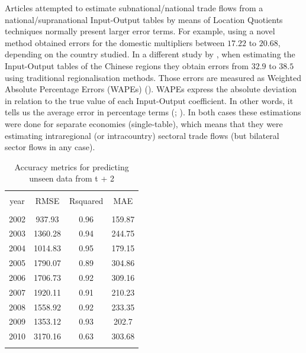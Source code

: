 \documentclass[]{interact}
\theoremstyle{plain}%
\theoremstyle{definition}
\theoremstyle{remark}
\begin{document}
Articles attempted to estimate subnational/national trade flows from a
national/supranational Input-Output tables by means of Location
Quotients techniques normally present larger error terms. For example,
\citet{pereira2020bidimensional} using a novel method obtained errors
for the domestic multipliers between \(17.22\) to \(20.68\), depending
on the country studied. In a different study by
\citet{jiang2012improved}, when estimating the Input-Output tables of
the Chinese regions they obtain errors from \(32.9\) to \(38.5\) using
traditional regionalisation methods. Those errors are measured as
Weighted Absolute Percentage Errors (WAPEs)
(\citet{sawyer1983experiments}). WAPEs express the absolute deviation in
relation to the true value of each Input-Output coefficient. In other
words, it tells us the average error in percentage terms
(\citet{lamonica2018performance}; \citet{pereira2020bidimensional}). In
both cases these estimations were done for separate economies
(single-table), which means that they were estimating intraregional (or
intracountry) sectoral trade flows (but bilateral sector flows in any
case).

\begin{table}[!htbp] \centering 
  \caption{Accuracy metrics  for predicting unseen data from t + 2\label{accuracy_test}} 
  \label{} 
\footnotesize 
\begin{tabular}{@{\extracolsep{0pt}} cccc} 
\\[-1.8ex]\hline 
\hline \\[-1.8ex] 
year & RMSE & Rsquared & MAE \\ 
\hline \\[-1.8ex] 
2002 & 937.93 & 0.96 & 159.87 \\ 
2003 & 1360.28 & 0.94 & 244.75 \\ 
2004 & 1014.83 & 0.95 & 179.15 \\ 
2005 & 1790.07 & 0.89 & 304.86 \\ 
2006 & 1706.73 & 0.92 & 309.16 \\ 
2007 & 1920.11 & 0.91 & 210.23 \\ 
2008 & 1558.92 & 0.92 & 233.35 \\ 
2009 & 1353.12 & 0.93 & 202.7 \\ 
2010 & 3170.16 & 0.63 & 303.68 \\ 
\hline \\[-1.8ex] 
\end{tabular} 
\end{table}
\end{document}
